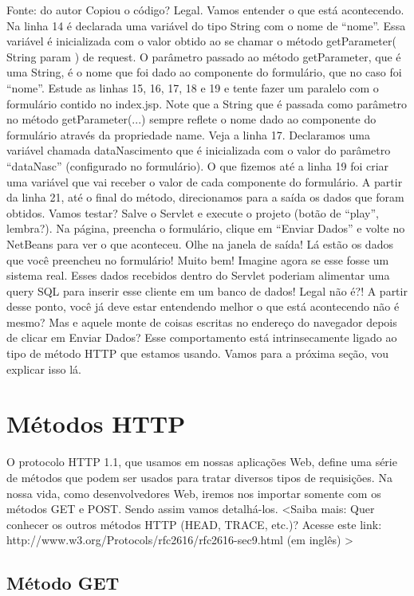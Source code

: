 Fonte: do autor
Copiou o código? Legal. Vamos entender o que está acontecendo. Na linha 14 é declarada uma variável do tipo String com o nome de “nome”. Essa variável é inicializada com o valor obtido ao se chamar o método getParameter( String param ) de request. O parâmetro passado ao método getParameter, que é uma String, é o nome que foi dado ao componente do formulário, que no caso foi “nome”. Estude as linhas 15, 16, 17, 18 e 19 e tente fazer um paralelo com o formulário contido no index.jsp. Note que a String que é passada como parâmetro no método getParameter(...) sempre reflete o nome dado ao componente do formulário através da propriedade name. Veja a linha 17. Declaramos uma variável chamada dataNascimento que é inicializada com o valor do parâmetro “dataNasc” (configurado no formulário).
O que fizemos até a linha 19 foi criar uma variável que vai receber o valor de cada componente do formulário. A partir da linha 21, até o final do método, direcionamos para a saída os dados que foram obtidos. Vamos testar? Salve o Servlet e execute o projeto (botão de “play”, lembra?). Na página, preencha o formulário, clique em “Enviar Dados” e volte no NetBeans para ver o que aconteceu. Olhe na janela de saída! Lá estão os dados que você preencheu no formulário! Muito bem! Imagine agora se esse fosse um sistema real. Esses dados recebidos dentro do Servlet poderiam alimentar uma query SQL para inserir esse cliente em um banco de dados! Legal não é?! A partir desse ponto, você já deve estar entendendo melhor o que está acontecendo não é mesmo? Mas e aquele monte de coisas escritas no endereço do navegador depois de clicar em Enviar Dados? Esse comportamento está intrinsecamente ligado ao tipo de método HTTP que estamos usando. Vamos para a próxima seção, vou explicar isso lá.


\section{Métodos HTTP}

O protocolo HTTP 1.1, que usamos em nossas aplicações Web, define uma série de métodos que podem ser usados para tratar diversos tipos de requisições. Na nossa vida, como desenvolvedores Web, iremos nos importar somente com os métodos GET e POST. Sendo assim vamos detalhá-los.
<Saiba mais:
Quer conhecer os outros métodos HTTP (HEAD, TRACE, etc.)? Acesse este link: http://www.w3.org/Protocols/rfc2616/rfc2616-sec9.html (em inglês)
>


\subsection{Método GET}

